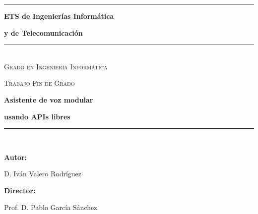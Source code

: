 \begin{titlepage}
\newlength{\centeroffset}
\setlength{\centeroffset}{-0.5\oddsidemargin}
\addtolength{\centeroffset}{0.5\evensidemargin}
\thispagestyle{empty}

	\begin{figure}[H]
		\hfill
	\end{figure}
	
	\setlength\parindent{60pt}
	\vspace{-35pt}
	\rule{5.5cm}{0.1pt}
	\vspace{10pt}
	
	\setlength\parindent{60pt}
	\textbf{ETS de Ingenierías Informática}
	
	\textbf{y de Telecomunicación}
	
	\vfill
	
	\noindent\rule[-1ex]{\textwidth}{3pt}\\[3.5ex]
	
	\large{\textsc{Grado en Ingeniería Informática}}
	
	\Large{\textsc{Trabajo Fin de Grado}}
	
	\vspace{20pt}
	
	\Huge{\textbf{Asistente de voz modular}}
	
	\huge{\textbf{usando APIs libres}}
	
	\noindent\rule[-1ex]{\textwidth}{3pt}\\[3.5ex]
	
	\vfill\normalsize
	
	\textbf{Autor:}
	
	D. Iván Valero Rodríguez\newline
	
	
	\textbf{Director:}
	
	Prof. D. Pablo García Sánchez\newline
	
	\end{titlepage}